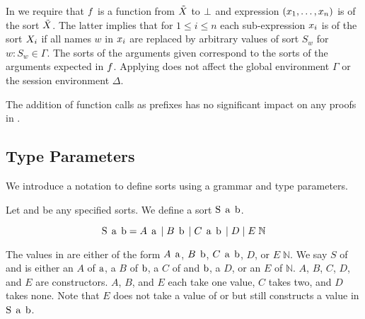 In \RSideEffect we require that $f$ is a function from $\tilde{X}$ to $\bot$ and expression $\left(x_1,\ldots,x_n\right)$ is of the sort $\tilde{X}$.
The latter implies that for $1 \leq i \leq n$ each sub-expression $x_i$ is of the sort $X_i$ if all names $w$ in $x_i$ are replaced by arbitrary values of sort $S_w$ for $w:S_w \in \Gamma$.
The sorts of the arguments given correspond to the sorts of the arguments expected in $f$.
Applying \RSideEffect does not affect the global environment $\Gamma$ or the session environment $\Delta$.

The addition of function calls as prefixes has no significant impact on any proofs in \cite{PetersEtal21}.

\subsection{Type Parameters}
We introduce a notation to define sorts using a grammar and type parameters.

Let \TypeParamA and \TypeParamB be any specified sorts.
We define a sort $\operatorname{S}\;\operatorname{a}\;\operatorname{b}$.

\[\operatorname{S}\;\operatorname{a}\;\operatorname{b} = A\;\operatorname{a} \; | \; B\;\operatorname{b} \; | \; C\;\operatorname{a}\;\operatorname{b} \; | \; D \; | \; E\;\mathbb{N}\]

The values in \Sab are either of the form $A\;\operatorname{a}$, $B\;\operatorname{b}$, $C\;\operatorname{a}\;\operatorname{b}$, $D$, or $E\;\mathbb{N}$.
We say $S$ of \TypeParamA and \TypeParamB is either an $A$ of $\operatorname{a}$, a $B$ of $\operatorname{b}$, a $C$ of \TypeParamA and $\operatorname{b}$, a $D$, or an $E$ of $\mathbb{N}$.
$A$, $B$, $C$, $D$, and $E$ are constructors.
$A$, $B$, and $E$ each take one value, $C$ takes two, and $D$ takes none.
Note that $E$ does not take a value of \TypeParamA or \TypeParamB but still constructs a value in $\operatorname{S}\;\operatorname{a}\;\operatorname{b}$.
